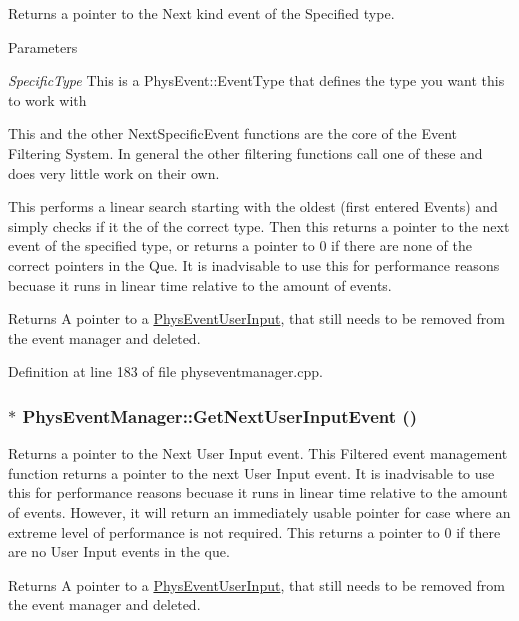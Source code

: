Returns a pointer to the Next kind event of the Specified type. 
\begin{DoxyParams}{Parameters}
\item[{\em SpecificType}]This is a PhysEvent::EventType that defines the type you want this to work with\end{DoxyParams}
This and the other NextSpecificEvent functions are the core of the Event Filtering System. In general the other filtering functions call one of these and does very little work on their own. \par
 This performs a linear search starting with the oldest (first entered Events) and simply checks if it the of the correct type. Then this returns a pointer to the next event of the specified type, or returns a pointer to 0 if there are none of the correct pointers in the Que. It is inadvisable to use this for performance reasons becuase it runs in linear time relative to the amount of events. \begin{DoxyReturn}{Returns}
A pointer to a \hyperlink{classPhysEventUserInput}{PhysEventUserInput}, that still needs to be removed from the event manager and deleted. 
\end{DoxyReturn}


Definition at line 183 of file physeventmanager.cpp.\hypertarget{classPhysEventManager_a4874a9b1138d2351bf28e527a66c02b8}{
\subsubsection[{GetNextUserInputEvent}]{ $\ast$ PhysEventManager::GetNextUserInputEvent ()}}
\label{d5/dd7/classPhysEventManager_a4874a9b1138d2351bf28e527a66c02b8}


Returns a pointer to the Next User Input event. This Filtered event management function returns a pointer to the next User Input event. It is inadvisable to use this for performance reasons becuase it runs in linear time relative to the amount of events. However, it will return an immediately usable pointer for case where an extreme level of performance is not required. This returns a pointer to 0 if there are no User Input events in the que. \begin{DoxyReturn}{Returns}
A pointer to a \hyperlink{classPhysEventUserInput}{PhysEventUserInput}, that still needs to be removed from the event manager and deleted. 
\end{DoxyReturn}


